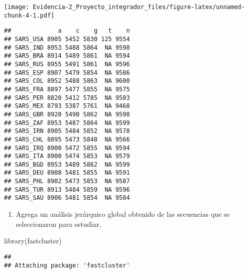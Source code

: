 \documentclass[
]{article}
\newenvironment{Shaded}{\begin{snugshade}}{\end{snugshade}}
\newcommand{\ConstantTok}[1]{\textcolor[rgb]{0.00,0.00,0.00}{#1}}
\newcommand{\FunctionTok}[1]{\textcolor[rgb]{0.00,0.00,0.00}{#1}}
\newcommand{\NormalTok}[1]{#1}
\newcommand{\OtherTok}[1]{\textcolor[rgb]{0.56,0.35,0.01}{#1}}
\newcommand{\SpecialCharTok}[1]{\textcolor[rgb]{0.00,0.00,0.00}{#1}}
\newcommand{\StringTok}[1]{\textcolor[rgb]{0.31,0.60,0.02}{#1}}
\providecommand{\tightlist}{%
  \setlength{\itemsep}{0pt}\setlength{\parskip}{0pt}}
\begin{document}
\texttt{[image: Evidencia-2\_Proyecto\_integrador\_files/figure-latex/unnamed-chunk-4-1.pdf]}

\begin{Shaded}
\end{Shaded}

\begin{verbatim}
##             a    c    g   t    n
## SARS_USA 8905 5452 5830 125 9554
## SARS_IND 8953 5488 5864  NA 9598
## SARS_BRA 8914 5489 5861  NA 9594
## SARS_RUS 8955 5491 5861  NA 9596
## SARS_ESP 8907 5479 5854  NA 9586
## SARS_COL 8952 5488 5863  NA 9600
## SARS_FRA 8897 5477 5855  NA 9575
## SARS_PER 8820 5412 5785  NA 9503
## SARS_MEX 8793 5387 5761  NA 9468
## SARS_GBR 8920 5490 5862  NA 9598
## SARS_ZAF 8953 5487 5864  NA 9599
## SARS_IRN 8905 5484 5852  NA 9578
## SARS_CHL 8895 5473 5848  NA 9566
## SARS_IRQ 8900 5472 5855  NA 9594
## SARS_ITA 8900 5474 5853  NA 9579
## SARS_BGD 8953 5489 5862  NA 9599
## SARS_DEU 8908 5481 5855  NA 9591
## SARS_PHL 8902 5473 5853  NA 9587
## SARS_TUR 8913 5484 5859  NA 9596
## SARS_SAU 8906 5481 5854  NA 9584
\end{verbatim}

\begin{enumerate}
\def\labelenumi{\arabic{enumi}.}
\setcounter{enumi}{3}
\tightlist
\item
  Agrega un análisis jerárquico global obtenido de las secuencias que se
  seleccionaron para estudiar.
\end{enumerate}

\begin{Shaded}
\begin{Highlighting}[]
\FunctionTok{library}\NormalTok{(fastcluster)}
\end{Highlighting}
\end{Shaded}

\begin{verbatim}
## 
## Attaching package: 'fastcluster'
\end{verbatim}
\end{document}
